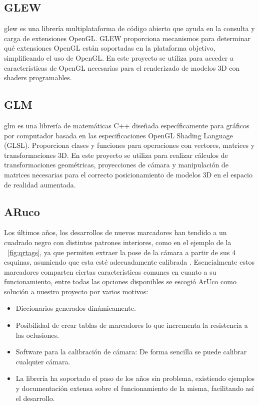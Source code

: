 \subsection{GLEW}
\acrfull{glew} es una librería multiplataforma de código abierto que ayuda en la consulta y carga de extensiones OpenGL. GLEW proporciona mecanismos para determinar qué extensiones OpenGL están soportadas en la plataforma objetivo, simplificando el uso de OpenGL. En este proyecto se utiliza para acceder a características de OpenGL necesarias para el renderizado de modelos 3D con shaders programables.

\subsection{GLM}
\acrfull{glm} es una librería de matemáticas C++ diseñada específicamente para gráficos por computador basada en las especificaciones OpenGL Shading Language (GLSL). Proporciona clases y funciones para operaciones con vectores, matrices y transformaciones 3D. En este proyecto se utiliza para realizar cálculos de transformaciones geométricas, proyecciones de cámara y manipulación de matrices necesarias para el correcto posicionamiento de modelos 3D en el espacio de realidad aumentada.

\subsection{ARuco}
Los últimos años, los desarrollos de nuevos marcadores han tendido a un cuadrado negro con distintos patrones interiores, como en el ejemplo de la \figurename~\ref{fig:qrtags}, ya que permiten extraer la pose de la cámara a partir de sus 4 esquinas, asumiendo que esta esté adecuadamente calibrada \cite{GarridoJurado2014}. Esencialmente estos marcadores comparten ciertas características comunes en cuanto a su funcionamiento, entre todas las opciones disponibles se escogió ArUco como solución a nuestro proyecto por varios motivos:
\begin{itemize}
    \item Diccionarios generados dinámicamente.
    \item Posibilidad de crear tablas de marcadores lo que incrementa la resistencia a las oclusiones.
    \item Software para la calibración de cámara: De forma sencilla se puede calibrar cualquier cámara.
    \item La librería ha soportado el paso de los años sin problema, existiendo ejemplos y documentación extensa sobre el funcionamiento de la misma, facilitando así el desarrollo.
\end{itemize}

